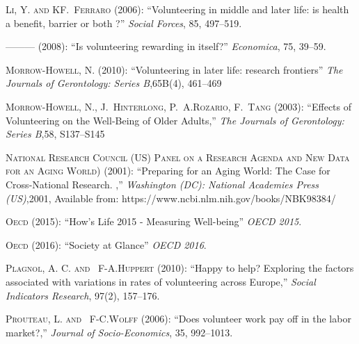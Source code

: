 \documentclass[10pt, letterpaper]{article}
\begin{document}
\begin{spacing}{1.4}
\begin{thebibliography}{87}
\textsc{Li, Y. and KF.~Ferraro} (2006): \enquote{Volunteering in middle and later life: is health a benefit, barrier or both ?} \emph{Social Forces}, 85, 497--519. 


---\hspace{-.1pt}---\hspace{-.1pt}--- (2008{}): \enquote{Is volunteering rewarding in itself?} \emph{Economica}, 75, 39--59.

\textsc{Morrow-Howell, N.} (2010):
  \enquote{Volunteering in later life: research frontiers} \emph{The Journals of Gerontology: Series B},65B(4), 461–469


\textsc{Morrow-Howell, N., J.~Hinterlong, P.~A.Rozario, F.~Tang} (2003):
  \enquote{Effects of Volunteering on the Well-Being of Older Adults,} \emph{The Journals of Gerontology: Series B},58, S137--S145

\textsc{National Research Council (US) Panel on a Research Agenda and New Data for an Aging World)} (2001):
  \enquote{Preparing for an Aging World: The Case for Cross-National Research. ,} \emph{Washington (DC): National Academies Press (US)},2001, Available from: https://www.ncbi.nlm.nih.gov/books/NBK98384/


\textsc{Oecd} (2015): \enquote{How's Life  2015 - Measuring Well-being} \emph{OECD 2015}.

\textsc{Oecd} (2016): \enquote{Society at Glance} \emph{OECD 2016}.

\textsc{Plagnol, A. C. and ~F-A.Huppert } (2010): \enquote{Happy to help? Exploring the factors associated with variations in rates of volunteering across Europe,} \emph{Social Indicators Research}, 97(2), 157--176.
  
\textsc{Prouteau, L. and ~F-C.Wolff } (2006): \enquote{Does volunteer work pay off in the labor market?,} \emph{Journal of Socio-Economics}, 35, 992--1013.


\end{thebibliography}
\end{spacing}
\end{document}
